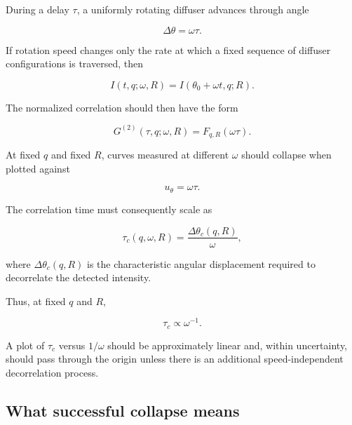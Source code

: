 \documentclass[11pt,letterpaper]{article}
\newcommand{\Gnorm}{G^{(2)}}
\begin{document}
During a delay $\tau$, a uniformly rotating diffuser advances through angle

\begin{equation}
    \Delta\theta = \omega\tau.
    \label{eq:angular_displacement}
\end{equation}

If rotation speed changes only the rate at which a fixed sequence of diffuser
configurations is traversed, then

\begin{equation}
    I(t,q;\omega,R)
    =
    I\left(\theta_0+\omega t,q;R\right).
\end{equation}

The normalized correlation should then have the form

\begin{equation}
    \boxed{
    \Gnorm(\tau,q;\omega,R)
    =
    F_{q,R}(\omega\tau).
    }
    \label{eq:first_collapse}
\end{equation}

At fixed $q$ and fixed $R$, curves measured at different $\omega$ should
collapse when plotted against

\begin{equation}
    u_\theta=\omega\tau.
\end{equation}

The correlation time must consequently scale as

\begin{equation}
    \boxed{
    \tau_c(q,\omega,R)
    =
    \frac{\Delta\theta_c(q,R)}{\omega},
    }
    \label{eq:tau_omega}
\end{equation}

where $\Delta\theta_c(q,R)$ is the characteristic angular displacement
required to decorrelate the detected intensity.

Thus, at fixed $q$ and $R$,

\begin{equation}
    \tau_c \propto \omega^{-1}.
\end{equation}

A plot of $\tau_c$ versus $1/\omega$ should be approximately linear and,
within uncertainty, should pass through the origin unless there is an
additional speed-independent decorrelation process.

\subsection{What successful collapse means}
\end{document}
